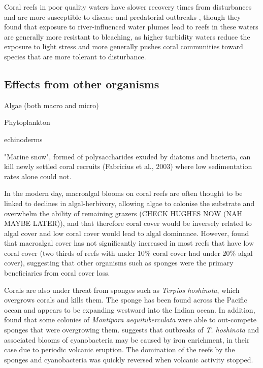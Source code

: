 \documentclass[11pt,a4paper]{article}
\begin{document}
Coral reefs in poor quality waters have slower recovery times from disturbances and are more susceptible to disease and predatorial outbreaks \citep{MacNeil2019}, though they found that exposure to river-influenced water plumes lead to reefs in these waters are generally more resistant to bleaching, as higher turbidity waters reduce the exposure to light stress and more generally pushes coral communities toward species that are more tolerant to disturbance.  




\subsection{Effects from other organisms}

Algae (both macro and micro)

Phytoplankton

echinoderms

"Marine snow", formed of polysaccharides exuded by diatoms and bacteria, can kill newly settled coral recruits (Fabricius et al., 2003) where low sedimentation rates alone could not. 

In the modern day, macroalgal blooms on coral reefs are often thought to be linked to declines in algal-herbivory, allowing algae to colonise the substrate and overwhelm the ability of remaining grazers \citep{Williams2001,Hughes1999} (CHECK HUGHES NOW (NAH MAYBE LATER)), and that therefore coral cover would be inversely related to algal cover and low coral cover would lead to algal dominance.
 However, \cite{Bruno2007} found that macroalgal cover has not significantly increased in most reefs that have low coral cover (two thirds of reefs with under 10\% coral cover had under 20\% algal cover), suggesting that other organisms such as sponges were the primary beneficiaries from coral cover loss.

Corals are also under threat from sponges \citep{Elliott2016} such as \textit{Terpios hoshinota}, which overgrows corals and kills them.
 The sponge has been found across the Pacific ocean and appears to be expanding westward into the Indian ocean. 
  In addition, \cite{Elliott2016} found that some colonies of \textit{Montipora aequituberculata} were able to out-compete sponges that were overgrowing them. 
  \cite{Schils2012} suggests that outbreaks of \textit{T. hoshinota} and associated blooms of cyanobacteria may be caused by iron enrichment, in their case due to periodic volcanic eruption. The domination of the reefs by the sponges and cyanobacteria was quickly reversed when volcanic activity stopped. 
\end{document}
